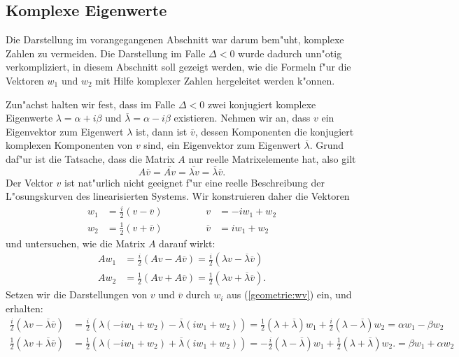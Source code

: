 %
%
\subsection{Komplexe Eigenwerte}
Die Darstellung im vorangegangenen Abschnitt war darum bem"uht,
komplexe Zahlen zu vermeiden.
Die Darstellung im Falle $\Delta<0$ wurde dadurch unn"otig verkompliziert,
in diesem Abschnitt soll gezeigt werden, wie die Formeln f"ur die Vektoren
$w_1$ und $w_2$ mit Hilfe komplexer Zahlen hergeleitet werden k"onnen.

Zun"achst halten wir fest, dass im Falle $\Delta<0$ zwei konjugiert
komplexe Eigenwerte
$
\lambda= \alpha + i\beta
$
und
$
\overline{\lambda}= \alpha - i\beta
$
existieren.
Nehmen wir an, dass $v$ ein Eigenvektor zum Eigenwert $\lambda$ ist,
dann ist $\overline{v}$, dessen Komponenten die konjugiert komplexen
Komponenten von $v$ sind, ein Eigenvektor zum Eigenwert $\overline{\lambda}$.
Grund daf"ur ist die Tatsache, dass die Matrix $A$ nur reelle Matrixelemente
hat, also gilt
\[
A\overline{v}
=
\overline{Av}
=
\overline{\lambda v}=\overline{\lambda}\overline{v}.
\]
Der Vektor $v$ ist nat"urlich nicht geeignet f"ur eine reelle Beschreibung
der L"osungskurven des linearisierten Systems.
Wir konstruieren daher die Vektoren
\begin{equation}
\begin{aligned}
w_1&=\frac{i}2(v-\overline v)
&&\qquad
&
v&=-iw_1+w_2
\\
w_2&=\frac12(v+\overline v)
&&\qquad
&
\overline{v}&=iw_1+w_2
\end{aligned}
\label{geometrie:wv}
\end{equation}
und untersuchen, wie die Matrix $A$ darauf wirkt:
\begin{align*}
Aw_1
&=
\frac{i}2(Av-A\overline v)
=
\frac{i}2(\lambda v-\overline{\lambda}\overline{v})
\\
Aw_2
&=
\frac12(Av+A\overline{v})
=
\frac12(\lambda v+\overline{\lambda}\overline{v}).
\end{align*}
Setzen wir die Darstellungen von $v$ und $\overline{v}$ durch $w_i$ aus 
(\ref{geometrie:wv}) ein, und erhalten:
\begin{align*}
\frac{i}2(\lambda v-\overline{\lambda}\overline{v})
&=
\frac{i}2(\lambda(-iw_1+w_2) -\overline{\lambda}(iw_1+w_2))
=
\frac{1}2(\lambda+\overline{\lambda}) w_1
+
\frac{i}2(\lambda-\overline{\lambda}) w_2
=\alpha w_1-\beta w_2
\\
\frac12(\lambda v+\overline{\lambda}\overline{v})
&=
\frac12(\lambda(-iw_1+w_2)+\overline{\lambda}(iw_1+w_2))
=
-\frac{i}2(\lambda-\overline{\lambda}) w_1
+
\frac12(\lambda+\overline{\lambda}) w_2.
=\beta w_1+\alpha w_2
\end{align*}
